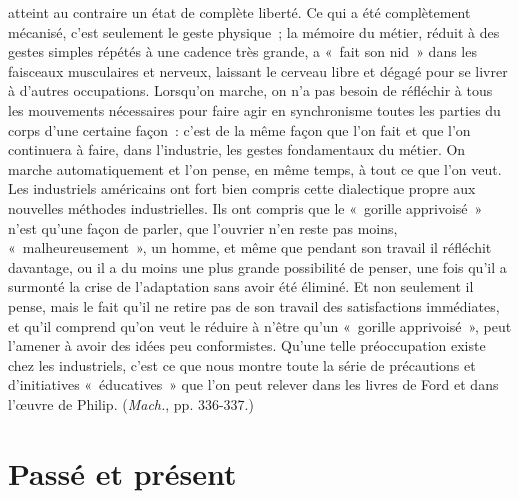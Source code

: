 \documentclass[french,twoside]{book} %
\newcommand\chapteropen{} %
\newcommand\chaptercont{} %
\newcommand\chapterclose{} %
\begin{document}
atteint au contraire un état de complète liberté. Ce qui a été complètement mécanisé, c’est seulement le geste physique ; la mémoire du métier, réduit à des gestes simples répétés à une cadence très grande, a « fait son nid » dans les faisceaux musculaires et nerveux, laissant le cerveau libre et dégagé pour se livrer à d’autres occupations. Lorsqu’on marche, on n’a pas besoin de réfléchir à tous les mouvements nécessaires pour faire agir en synchronisme toutes les parties du corps d’une certaine façon : c’est de la même façon que l’on fait et que l’on continuera à faire, dans l’industrie, les gestes fondamentaux du métier. On marche automatiquement et l’on pense, en même temps, à tout ce que l’on veut. Les industriels américains ont fort bien compris cette dialectique propre aux nouvelles méthodes industrielles. Ils ont compris que le « gorille apprivoisé » n’est qu’une façon de parler, que l’ouvrier n’en reste pas moins, « malheureusement », un homme, et même que pendant son travail il réfléchit davantage, ou il a du moins une plus grande possibilité de penser, une fois qu’il a surmonté la crise de l’adaptation sans avoir été éliminé. Et non seulement il pense, mais le fait qu’il ne retire pas de son travail des satisfactions immédiates, et qu’il comprend qu’on veut le réduire à n’être qu’un « gorille apprivoisé », peut l’amener à avoir des idées peu conformistes. Qu'une telle préoccupation existe chez les industriels, c’est ce que nous montre toute la série de précautions et d’initiatives « éducatives » que l’on peut relever dans les livres de Ford et dans l’œuvre de Philip. (\emph{Mach.}, pp. 336-337.)
\chapterclose


\chapteropen
\chapter[{Passé et présent}]{Passé et présent}\renewcommand{\leftmark}{Passé et présent}


\chaptercont
\end{document}

